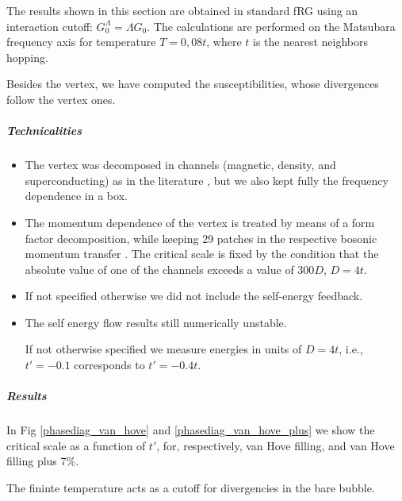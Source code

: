The results shown in this section are obtained in standard fRG using an interaction cutoff: $G_0^\Lambda = \Lambda G_0$. The calculations are performed on the Matsubara frequency axis for temperature $T=0,08 t$, where $t$ is the nearest neighbors hopping.  

Besides the vertex, we have computed the susceptibilities, whose divergences follow the vertex ones. 

\subparagraph{Technicalities}
\begin{itemize} 

\item The vertex was decomposed in channels (magnetic, density, and superconducting) as in the literature \cite{Husemann2009, Husemann2012}, but we also kept fully the frequency dependence in a box. 

\item The momentum dependence of the vertex is treated by means of a form factor decomposition, while keeping 29 patches in the respective bosonic momentum transfer . The critical scale is fixed by the condition that the absolute value of one of the channels exceeds a value of 300$D$, $D=4t$. 


\item If not specified otherwise we did not include the self-energy feedback. 

\item The self energy flow results still numerically unstable.  
 
If not otherwise specified we measure energies in units of $D=4t$, i.e., $t'=-0.1$ corresponds to $t'=-0.4t$.
\end{itemize} 
 
\subparagraph{Results} 

In Fig \ref{phasediag_van_hove} and \ref{phasediag_van_hove_plus} we show  the critical scale as a function of $t'$, for, respectively, van Hove filling, and van Hove filling plus 7\%.    

The fininte temperature acts as a cutoff for divergencies in the bare bubble. 

